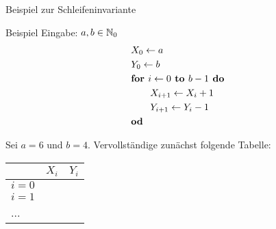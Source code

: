 \begin{frame}{Beispiel zur Schleifeninvariante}
	\begin{exampleblock}{Beispiel}
		Eingabe: $a,b \in \mathbb{N}_0$
		\begin{align*}
			&X_0 \leftarrow a\\
			&Y_0 \leftarrow b\\
			&\text{\textbf{for }} i \leftarrow 0 \text{\textbf{ to }} b-1 \text{\textbf{ do}}\\
			&\qquad X_{i+1} \leftarrow X_{i} + 1\\
			&\qquad Y_{i+1} \leftarrow Y_{i} - 1\\
			&\text{\textbf{od}}
		\end{align*}

		Sei $a=6$ und $b=4$. Vervollständige zunächst folgende Tabelle:
		\begin{center}\begin{tabular}{l c r}
			 &$X_i$&$Y_i$\\
			\hline
			$i=0$ & & \\
			$i=1$ & & \\
			...& & 
		\end{tabular}\end{center}
	\end{exampleblock}
\end{frame}

